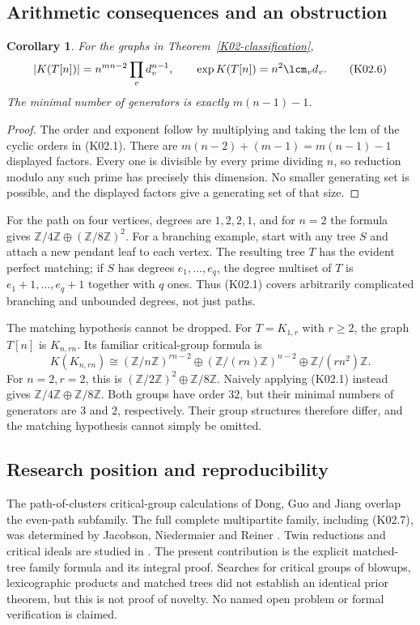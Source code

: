 \documentclass[11pt,a4paper]{article}
\newtheorem{corollary}[theorem]{Corollary}
\theoremstyle{definition}\newtheorem{definition}[theorem]{Definition}
\theoremstyle{remark}\newtheorem{remark}[theorem]{Remark}
\newcommand{\Z}{\mathbb Z}\newcommand{\Q}{\mathbb Q}\newcommand{\F}{\mathbb F}
\numberwithin{equation}{section}
\begin{document}
\subsection{Arithmetic consequences and an obstruction}\label{K02-sec-4}
\begin{corollary}
For the graphs in Theorem~\ref{K02-classification},
\[
 |K(T[n])|=n^{mn-2}\prod_vd_v^{n-1},\qquad
 \exp K(T[n])=n^2\lcm_vd_v.                                  \tag{K02.6}
\]
The minimal number of generators is exactly $m(n-1)-1$.
\end{corollary}
\begin{proof}
The order and exponent follow by multiplying and taking the lcm of the cyclic orders in (K02.1). There are $m(n-2)+(m-1)=m(n-1)-1$ displayed factors. Every one is divisible by every prime dividing $n$, so reduction modulo any such prime has precisely this dimension. No smaller generating set is possible, and the displayed factors give a generating set of that size.
\end{proof}
For the path on four vertices, degrees are $1,2,2,1$, and for $n=2$ the formula gives $\Z/4\Z\oplus(\Z/8\Z)^2$. For a branching example, start with any tree $S$ and attach a new pendant leaf to each vertex. The resulting tree $T$ has the evident perfect matching; if $S$ has degrees $e_1,\ldots,e_q$, the degree multiset of $T$ is $e_1+1,\ldots,e_q+1$ together with $q$ ones. Thus (K02.1) covers arbitrarily complicated branching and unbounded degrees, not just paths.

The matching hypothesis cannot be dropped. For $T=K_{1,r}$ with $r\geq2$, the graph $T[n]$ is $K_{n,rn}$. Its familiar critical-group formula is
\[
 K(K_{n,rn})\cong(\Z/n\Z)^{rn-2}\oplus(\Z/(rn)\Z)^{n-2}
                    \oplus\Z/(rn^2)\Z.                       \tag{K02.7}
\]
For $n=2,r=2$, this is $(\Z/2\Z)^2\oplus\Z/8\Z$. Naively applying (K02.1) instead gives $\Z/4\Z\oplus\Z/8\Z$. Both groups have order $32$, but their minimal numbers of generators are $3$ and $2$, respectively. Their group structures therefore differ, and the matching hypothesis cannot simply be omitted.

\subsection{Research position and reproducibility}\label{K02-sec-5}
The path-of-clusters critical-group calculations of Dong, Guo and Jiang \cite{ref028} overlap the even-path subfamily. The full complete multipartite family, including (K02.7), was determined by Jacobson, Niedermaier and Reiner \cite{ref032}. Twin reductions and critical ideals are studied in \cite{ref029}. The present contribution is the explicit matched-tree family formula and its integral proof. Searches for critical groups of blowups, lexicographic products and matched trees did not establish an identical prior theorem, but this is not proof of novelty. No named open problem or formal verification is claimed.
\end{document}
